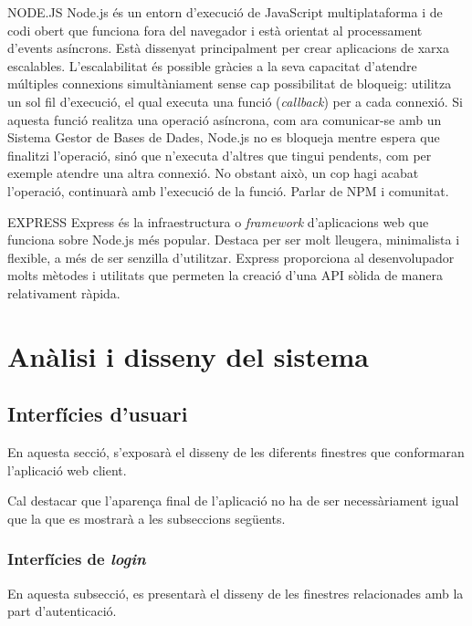 \documentclass[a4paper,12pt]{ThesisStyle}
\begin{document}
NODE.JS
Node.js és un entorn d'execució de JavaScript multiplataforma i de codi obert que funciona fora del navegador i està orientat al processament d'events asíncrons. Està dissenyat principalment per crear aplicacions de xarxa escalables. L'escalabilitat és possible gràcies a la seva capacitat d'atendre múltiples connexions simultàniament sense cap possibilitat de bloqueig: utilitza un sol fil d'execució, el qual executa una funció (\textit{callback}) per a cada connexió. Si aquesta funció realitza una operació asíncrona, com ara comunicar-se amb un Sistema Gestor de Bases de Dades, Node.js no es bloqueja mentre espera que finalitzi l'operació, sinó que n'executa d'altres que tingui pendents, com per exemple atendre una altra connexió. No obstant això, un cop hagi acabat l'operació, continuarà amb l'execució de la funció.
Parlar de NPM i comunitat.

EXPRESS
Express és la infraestructura o \textit{framework} d'aplicacions web que funciona sobre Node.js més popular. Destaca per ser molt lleugera, minimalista i flexible, a més de ser senzilla d'utilitzar. Express proporciona al desenvolupador molts mètodes i utilitats que permeten la creació d'una API sòlida de manera relativament ràpida. 

\chapter{Anàlisi i disseny del sistema}
\label{cap:analisi}

\section{Interfícies d'usuari}
\label{sec:interficies_usuari}

En aquesta secció, s'exposarà el disseny de les diferents finestres que conformaran l'aplicació web client.

Cal destacar que l'aparença final de l'aplicació no ha de ser necessàriament igual que la que es mostrarà a les subseccions següents.

\subsection{Interfícies de \textit{login}}
\label{subsec:interficies_login}

En aquesta subsecció, es presentarà el disseny de les finestres relacionades amb la part d'autenticació.
\end{document}
